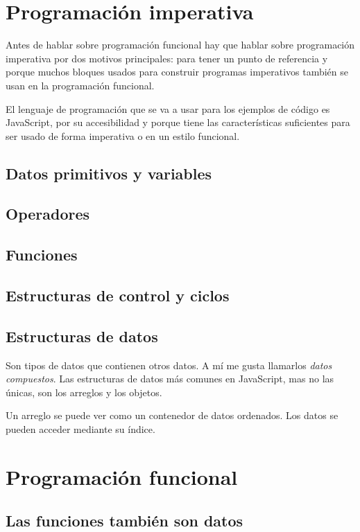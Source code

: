 \documentclass{article}
\begin{document}
\section*{Programación imperativa}
Antes de hablar sobre programación funcional hay que hablar sobre programación imperativa por dos motivos principales: para tener un punto de referencia y porque muchos bloques usados para construir programas imperativos también se usan en la programación funcional.

El lenguaje de programación que se va a usar para los ejemplos de código es JavaScript, por su accesibilidad y porque tiene las características suficientes para ser usado de forma imperativa o en un estilo funcional.\cite{why-js}

\subsection*{Datos primitivos y variables}

\subsection*{Operadores}

\subsection*{Funciones}

\subsection*{Estructuras de control y ciclos}

\subsection*{Estructuras de datos}
Son tipos de datos que contienen otros datos. A mí me gusta llamarlos \textit{datos compuestos}. Las estructuras de datos más comunes en JavaScript, mas no las únicas, son los arreglos y los objetos.

Un arreglo se puede ver como un contenedor de datos ordenados. Los datos se pueden acceder mediante su índice.


\section*{Programación funcional}

\subsection*{Las funciones también son datos}
\end{document}
